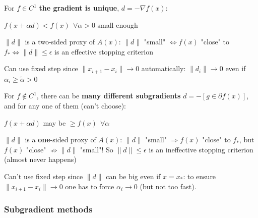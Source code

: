 \documentclass[10pt]{report}
\begin{document}
For $f\in C^1$ \textbf{the gradient is unique}, $d=-\nabla f(x)$:
\begin{list}{}{}
	\item $f(x+\alpha d) < f(x)\:\:\forall\alpha > 0$ small enough
	\item $\|d\|$ is a two-sided proxy of $A(x)$: $\|d\|$ "small" $\Leftrightarrow f(x)$ "close" to $f_*\Leftrightarrow \|d\|\leq \epsilon$ is an effective stopping criterion
	\item Can use fixed step since $\|x_{i+1}-x_i\|\rightarrow 0$ automatically: $\|d_i\|\rightarrow 0$ even if $\alpha_i \geq \tilde{\alpha} > 0$
\end{list}
For $f\not\in C^1$, there can be \textbf{many different subgradients} $d = -[g\in\partial f(x)]$, and for any one of them (can't choose):
\begin{list}{}{}
	\item $f(x+\alpha d)$ may be $\geq f(x)\:\:\forall\alpha$
	\item $\|d\|$ is a \textbf{one}-sided proxy of $A(x)$: $\|d\|$ "small" $\Rightarrow f(x)$ "close" to $f_*$, but $f(x)$ "close" $\not\Rightarrow \|d\|$ "small"! So $\|d\|\leq \epsilon$ is an ineffective stopping criterion (almost never happens)
	\item Can't use fixed step since $\|d\|$ can be big even if $x = x_*$: to ensure $\|x_{i+1}-x_i\|\rightarrow 0$ one has to force $\alpha_i\rightarrow 0$ (but not too fast).
\end{list}
\subsubsection{Subgradient methods}
\end{document}
